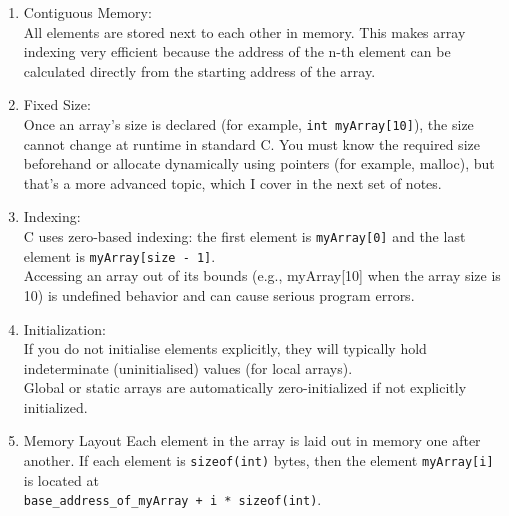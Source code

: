 \documentclass[a4paper,12pt]{article}
\begin{document}
\begin{enumerate}
    \item Contiguous Memory:\\
    All elements are stored next to each other in memory. This makes array indexing very efficient because the address of the n-th element can be calculated directly from the starting address of the array.

    \item Fixed Size:\\
    Once an array’s size is declared (for example, \verb|int myArray[10]|), the size cannot change at runtime in standard C. You must know the required size beforehand or allocate dynamically using pointers (for example, malloc), but that’s a more advanced topic, which I cover in the next set of notes.

    \item Indexing:\\
    C uses zero-based indexing: the first element is \verb|myArray[0]| and the last element is \verb|myArray[size - 1]|.\\
    Accessing an array out of its bounds (e.g., myArray[10] when the array size is 10) is undefined behavior and can cause serious program errors.

    \item Initialization:\\
    If you do not initialise elements explicitly, they will typically hold indeterminate (uninitialised) values (for local arrays).\\
    Global or static arrays are automatically zero-initialized if not explicitly initialized.\\
    
    \item Memory Layout
    Each element in the array is laid out in memory one after another. If each element is \verb|sizeof(int)| bytes, then the element \verb|myArray[i]| is located at\\
     \verb|base_address_of_myArray + i * sizeof(int)|.
\end{enumerate}

\begin{center}
\end{center}
\end{document}

